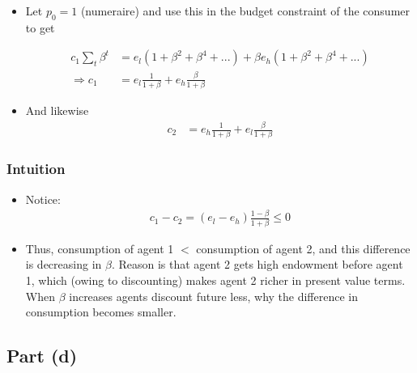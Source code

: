 \documentclass{scrartcl}
\newcommand{\bit}{\begin{itemize}}
\newcommand{\eit}{\end{itemize}}
\begin{document}
\begin{itemize}
	\item Let $p_0=1$ (numeraire) and use this in the budget constraint of the consumer to get
	
	\begin{align}
	c_1 \sum_t \beta^t&= e_l (1+\beta^2+\beta^4+...)+ \beta e_h (1+\beta^2+\beta^4+...)  \\
	\Rightarrow c_{1}&=e_l \frac{1}{1+\beta}+e_h \frac{\beta}{1+\beta}
	\end{align}
	
	\item And likewise
	\begin{align}
	c_{2}&=e_h \frac{1}{1+\beta}+e_l \frac{\beta}{1+\beta}
	\end{align}
	
	\end{itemize}

\subsubsection*{Intuition}

\bit

\item Notice:
\begin{align}
c_1-c_2=\left( e_l-e_h\right)\frac{1-\beta}{1+\beta} \leq 0
\end{align}

\item Thus, consumption of agent 1 $<$ consumption of agent 2, and this difference is decreasing in $\beta$. Reason is that agent 2 gets high endowment before agent 1, which (owing to discounting) makes agent 2 richer in present value terms. When $\beta$ increases agents discount future less, why the difference in consumption becomes smaller.

\eit


\subsection*{Part (d)}
\end{document}
